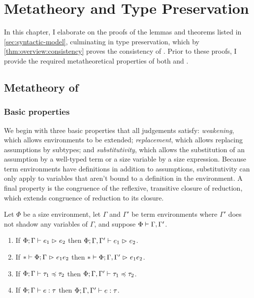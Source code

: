 \chapter{Metatheory and Type Preservation} \label{ch:proofs}



In this chapter, I elaborate on the proofs of the lemmas and theorems listed in \cref{sec:syntactic-model},
culminating in type preservation, which by \cref{thm:overview:consistency} proves the consistency of \lang.
Prior to these proofs, I provide the required metatheoretical properties of both \lang and \CICE.

\section{Metatheory of \lang}

\subsection{Basic properties}

We begin with three basic properties that all judgements satisfy:
\emph{weakening}, which allows environments to be extended;
\emph{replacement}, which allows replacing assumptions by subtypes;
and \emph{substitutivity}, which allows the substitution of an assumption by a well-typed term
or a size variable by a size expression.
Because term environments have definitions in addition to assumptions,
substitutivity can only apply to variables that aren't bound to a definition in the environment.
A final property is the congruence of the reflexive, transitive closure of reduction,
which extends congruence of reduction to its closure.

\begin{lemma}[Weakening] \label{lem:weakening}
Let $\Phi$ be a size environment,
let $\Gamma$ and $\Gamma'$ be term environments
where $\Gamma'$ does not shadow any variables of $\Gamma$,
and suppose $\Phi \mathrel{\vdash} \Gamma, \Gamma'$.
\begin{enumerate}[noitemsep]
  \item \label{item:weakening:red} If $\Phi; \Gamma \mathrel{\vdash} e_1 \mathrel{\rhd}_{} e_2$ then $\Phi; \Gamma, \Gamma' \mathrel{\vdash} e_1 \mathrel{\rhd}_{} e_2$.
  \item \label{item:weakening:red*} If $* \mathrel{\vdash} \Phi; \Gamma \mathrel{\rhd}_{} e_1{e_2}$ then $* \mathrel{\vdash} \Phi; \Gamma, \Gamma' \mathrel{\rhd}_{} e_1{e_2}$.
  \item \label{item:weakening:subtype} If $\Phi; \Gamma \mathrel{\vdash} \tau_1 \mathrel{\preccurlyeq} \tau_2$ then $\Phi; \Gamma, \Gamma' \mathrel{\vdash} \tau_1 \mathrel{\preccurlyeq} \tau_2$.
  \item If $\Phi; \Gamma \mathrel{\vdash} e \mathrel{:} \tau$ then $\Phi; \Gamma, \Gamma' \mathrel{\vdash} e \mathrel{:} \tau$.
\end{enumerate}
\end{lemma}

